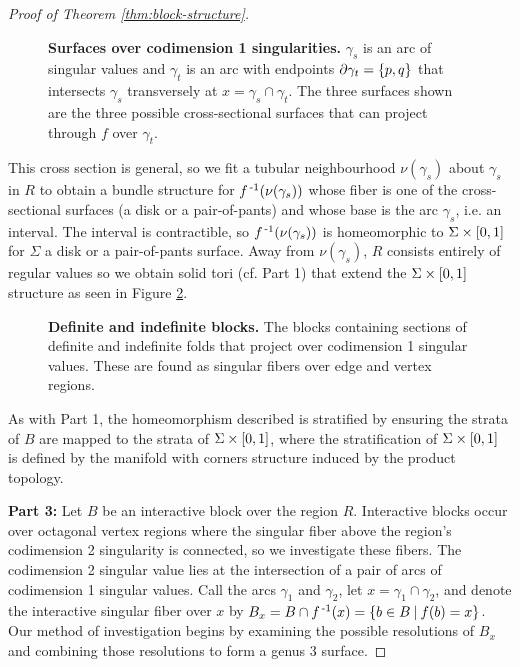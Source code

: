 \begin{proof}[Proof of Theorem \ref{thm:block-structure}]
	\begin{figure}[h!]
		\caption{
			\textbf{Surfaces over codimension 1 singularities.}
			$\gamma_s$ is an arc of singular values and $\gamma_t$ is an arc with endpoints $\partial\gamma_t = \{p,q\}$ that intersects $\gamma_s$ transversely at $x=\gamma_s\cap\gamma_t$.
			The three surfaces shown are the three possible cross-sectional surfaces that can project through $f$ over $\gamma_t$.
		}
		\label{fig:codim-1-surfaces}
	\end{figure}
	
	This cross section is general, so we fit a tubular neighbourhood $\nu(\gamma_s)$ about $\gamma_s$ in $R$ to obtain a bundle structure for $f^{\,\text{-}1}(\nu(\gamma_s))$ whose fiber is one of the cross-sectional surfaces (a disk or a pair-of-pants) and whose base is the arc $\gamma_s$, i.e. an interval.
	The interval is contractible, so $f^{\,\text{-}1}(\nu(\gamma_s))$ is homeomorphic to $\Sigma\times[0,1]$ for $\Sigma$ a disk or a pair-of-pants surface.
	Away from $\nu(\gamma_s)$, $R$ consists entirely of regular values so we obtain solid tori (cf. Part 1) that extend the $\Sigma\times[0,1]$ structure as seen in Figure \ref{fig:codim-1-blocks}.
		
	\begin{figure}[h!]
		\caption{
			\textbf{Definite and indefinite blocks.}
			The blocks containing sections of definite and indefinite folds that project over codimension 1 singular values.
			These are found as singular fibers over edge and vertex regions.
		}
		\label{fig:codim-1-blocks}
	\end{figure}

	As with Part 1, the homeomorphism described is stratified by ensuring the strata of $B$ are mapped to the strata of $\Sigma \times [0,1]$, where the stratification of $\Sigma \times [0,1]$ is defined by the manifold with corners structure induced by the product topology.
	
	\textbf{Part 3:}	
	Let $B$ be an interactive block over the region $R$.
	Interactive blocks occur over octagonal vertex regions where the singular fiber above the region's codimension 2 singularity is connected, so we investigate these fibers.
	The codimension 2 singular value lies at the intersection of a pair of arcs of codimension 1 singular values.
	Call the arcs $\gamma_1$ and $\gamma_2$, let $x = \gamma_1\cap \gamma_2$, and denote the interactive singular fiber over $x$ by $B_x = B\cap f^{\,\text{-}1}(x) = \{b\in B\:|\:f(b)=x\}$.
	Our method of investigation begins by examining the possible resolutions of $B_x$ and combining those resolutions to form a genus 3 surface.
	 

\end{proof}
